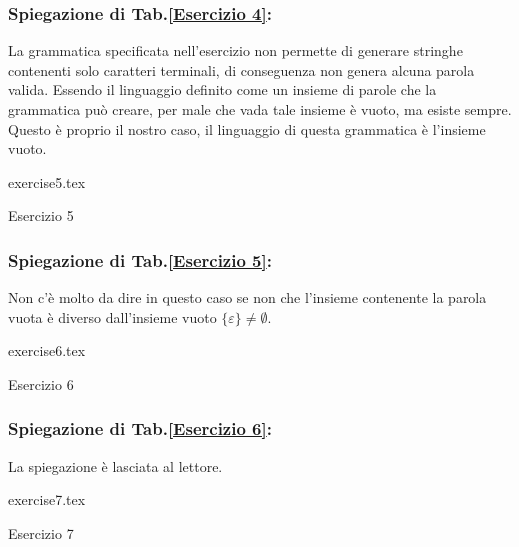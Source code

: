 \documentclass[class=book, crop=false, oneside, 12pt]{standalone}
\begin{document}
\subsubsection*{Spiegazione di Tab.\ref{Esercizio 4}:}
La grammatica specificata nell'esercizio non permette di generare stringhe contenenti solo caratteri terminali, di conseguenza non genera alcuna parola valida. Essendo il linguaggio definito come un insieme di parole che la grammatica può creare, per male che vada tale insieme è vuoto, ma esiste sempre. Questo è proprio il nostro caso, il linguaggio di questa grammatica è l’insieme vuoto.
\begin{table}[H]
	\centering
	{exercise5.tex}
    \caption{Esercizio 5}
    \label{Esercizio 5}
\end{table}
\subsubsection*{Spiegazione di Tab.\ref{Esercizio 5}:}
Non c'è molto da dire in questo caso se non che l’insieme contenente la parola vuota è diverso dall’insieme vuoto \(\{\varepsilon\} \neq \emptyset\).
\begin{table}[H]
	\centering
	{exercise6.tex}
    \caption{Esercizio 6}
    \label{Esercizio 6}
\end{table}
\subsubsection*{Spiegazione di Tab.\ref{Esercizio 6}:}
La spiegazione è lasciata al lettore.
\begin{table}[H]
	\centering
	{exercise7.tex}
    \caption{Esercizio 7}
    \label{Esercizio 7}
\end{table}
\end{document}
